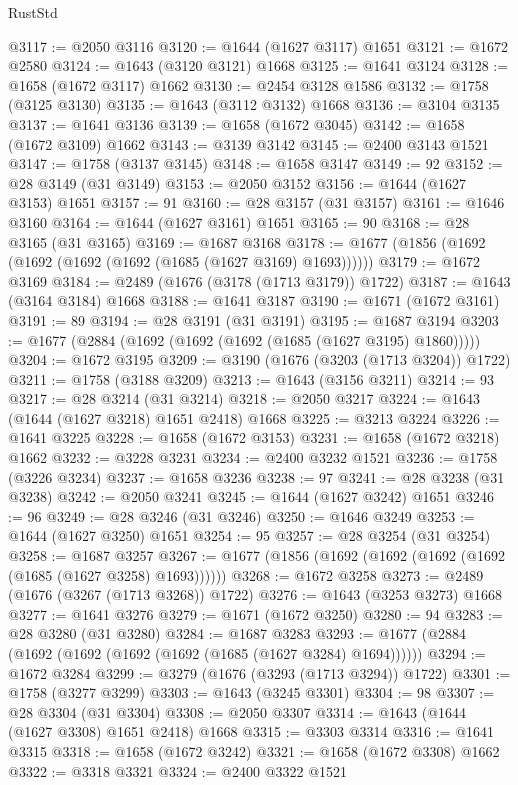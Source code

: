 \begin{lexlean}{RustStd}
\begin{coremodule}
@3117 := @2050 @3116
@3120 := @1644 (@1627 @3117) @1651
@3121 := @1672 @2580
@3124 := @1643 (@3120 @3121) @1668
@3125 := @1641 @3124
@3128 := @1658 (@1672 @3117) @1662
@3130 := @2454 @3128 @1586
@3132 := @1758 (@3125 @3130)
@3135 := @1643 (@3112 @3132) @1668
@3136 := @3104 @3135
@3137 := @1641 @3136
@3139 := @1658 (@1672 @3045)
@3142 := @1658 (@1672 @3109) @1662
@3143 := @3139 @3142
@3145 := @2400 @3143 @1521
@3147 := @1758 (@3137 @3145)
@3148 := @1658 @3147
@3149 := 92
@3152 := @28 @3149 (@31 @3149)
@3153 := @2050 @3152
@3156 := @1644 (@1627 @3153) @1651
@3157 := 91
@3160 := @28 @3157 (@31 @3157)
@3161 := @1646 @3160
@3164 := @1644 (@1627 @3161) @1651
@3165 := 90
@3168 := @28 @3165 (@31 @3165)
@3169 := @1687 @3168
@3178 := @1677 (@1856 (@1692 (@1692 (@1692 (@1692 (@1685 (@1627 @3169) @1693))))))
@3179 := @1672 @3169
@3184 := @2489 (@1676 (@3178 (@1713 @3179)) @1722)
@3187 := @1643 (@3164 @3184) @1668
@3188 := @1641 @3187
@3190 := @1671 (@1672 @3161)
@3191 := 89
@3194 := @28 @3191 (@31 @3191)
@3195 := @1687 @3194
@3203 := @1677 (@2884 (@1692 (@1692 (@1692 (@1685 (@1627 @3195) @1860)))))
@3204 := @1672 @3195
@3209 := @3190 (@1676 (@3203 (@1713 @3204)) @1722)
@3211 := @1758 (@3188 @3209)
@3213 := @1643 (@3156 @3211)
@3214 := 93
@3217 := @28 @3214 (@31 @3214)
@3218 := @2050 @3217
@3224 := @1643 (@1644 (@1627 @3218) @1651 @2418) @1668
@3225 := @3213 @3224
@3226 := @1641 @3225
@3228 := @1658 (@1672 @3153)
@3231 := @1658 (@1672 @3218) @1662
@3232 := @3228 @3231
@3234 := @2400 @3232 @1521
@3236 := @1758 (@3226 @3234)
@3237 := @1658 @3236
@3238 := 97
@3241 := @28 @3238 (@31 @3238)
@3242 := @2050 @3241
@3245 := @1644 (@1627 @3242) @1651
@3246 := 96
@3249 := @28 @3246 (@31 @3246)
@3250 := @1646 @3249
@3253 := @1644 (@1627 @3250) @1651
@3254 := 95
@3257 := @28 @3254 (@31 @3254)
@3258 := @1687 @3257
@3267 := @1677 (@1856 (@1692 (@1692 (@1692 (@1692 (@1685 (@1627 @3258) @1693))))))
@3268 := @1672 @3258
@3273 := @2489 (@1676 (@3267 (@1713 @3268)) @1722)
@3276 := @1643 (@3253 @3273) @1668
@3277 := @1641 @3276
@3279 := @1671 (@1672 @3250)
@3280 := 94
@3283 := @28 @3280 (@31 @3280)
@3284 := @1687 @3283
@3293 := @1677 (@2884 (@1692 (@1692 (@1692 (@1692 (@1685 (@1627 @3284) @1694))))))
@3294 := @1672 @3284
@3299 := @3279 (@1676 (@3293 (@1713 @3294)) @1722)
@3301 := @1758 (@3277 @3299)
@3303 := @1643 (@3245 @3301)
@3304 := 98
@3307 := @28 @3304 (@31 @3304)
@3308 := @2050 @3307
@3314 := @1643 (@1644 (@1627 @3308) @1651 @2418) @1668
@3315 := @3303 @3314
@3316 := @1641 @3315
@3318 := @1658 (@1672 @3242)
@3321 := @1658 (@1672 @3308) @1662
@3322 := @3318 @3321
@3324 := @2400 @3322 @1521

\end{coremodule}
\end{lexlean}
